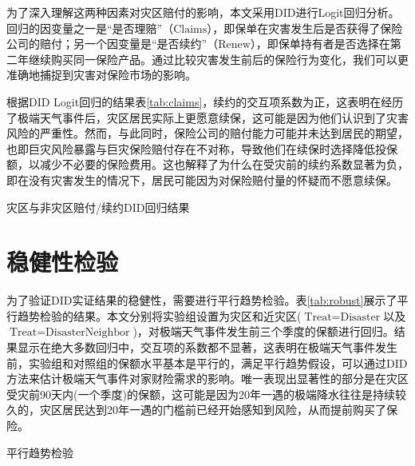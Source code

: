 为了深入理解这两种因素对灾区赔付的影响，本文采用DID进行Logit回归分析。回归的因变量之一是“是否理赔”（$\text{Claims}$），即保单在灾害发生后是否获得了保险公司的赔付；另一个因变量是“是否续约”（$\text{Renew}$），即保单持有者是否选择在第二年继续购买同一保险产品。通过比较灾害发生前后的保险行为变化，我们可以更准确地捕捉到灾害对保险市场的影响。

根据DID Logit回归的结果表\ref{tab:claims}，续约的交互项系数为正，这表明在经历了极端天气事件后，灾区居民实际上更愿意续保，这可能是因为他们认识到了灾害风险的严重性。然而，与此同时，保险公司的赔付能力可能并未达到居民的期望，也即巨灾风险暴露与巨灾保险赔付存在不对称\citep{张旭升2010中国巨灾风险暴露与巨灾保险赔付不对称实证}，导致他们在续保时选择降低投保额，以减少不必要的保险费用。这也解释了为什么在受灾前的续约系数显著为负，即在没有灾害发生的情况下，居民可能因为对保险赔付量的怀疑而不愿意续保。

\begin{table}[htbp]
    \centering
    \caption{灾区与非灾区赔付/续约DID回归结果}\label{tab:claims}
    
\end{table}

\section{稳健性检验}
为了验证DID实证结果的稳健性，需要进行平行趋势检验。表\ref{tab:robust}展示了平行趋势检验的结果。本文分别将实验组设置为灾区和近灾区($\text{Treat}=\text{Disaster}$以及$\text{Treat}=\text{Disaster}\text{Neighbor}$)，对极端天气事件发生前三个季度的保额进行回归。结果显示在绝大多数回归中，交互项的系数都不显著，这表明在极端天气事件发生前，实验组和对照组的保额水平基本是平行的，满足平行趋势假设，可以通过DID方法来估计极端天气事件对家财险需求的影响。唯一表现出显著性的部分是在灾区受灾前90天内(一个季度)的保额，这可能是因为20年一遇的极端降水往往是持续较久的，灾区居民达到20年一遇的门槛前已经开始感知到风险，从而提前购买了保险。
\begin{table}[htbp]
    \centering
    \caption{平行趋势检验}\label{tab:robust}
    
\end{table}
